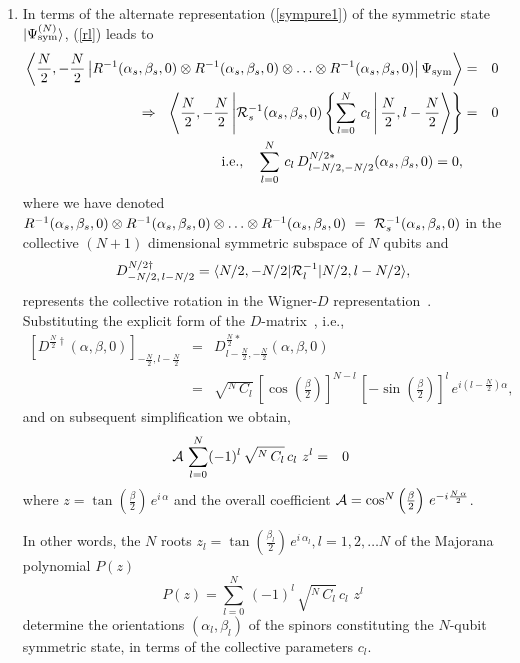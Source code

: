 \documentclass[pra,preprint,a4paper,superscriptaddress]{revtex4}
\begin{document}
{\begin{enumerate}
\item In terms of the alternate representation (\ref{sympure1}) of the symmetric state 
$\vert \Psi^{(N)}_{\rm sym}\rangle$, (\ref{rl}) leads to 
\begin{eqnarray}
\label{prelim}
\left\langle \frac{N}{2},-\frac{N}{2}\left\vert 
R^{-1}(\alpha_s,\beta_s,0)\otimes R^{-1}(\alpha_s,\beta_s,0)\otimes 
\ldots  \otimes R^{-1}(\alpha_s,\beta_s,0) \right \vert \Psi_{\rm sym}\right\rangle&=&0\nonumber \\ 
\Rightarrow\ \ \left\langle \frac{N}{2},-\frac{N}{2}\left \vert {\cal R}_s^{-1}(\alpha_s,\beta_s,0) \left\{\sum_{l=0}^N\, c_l\, \right \vert \frac{N}{2},l-\frac{N}{2}\right \rangle\right\}&=&0 \nonumber \\
{\rm i.e.,} \ \ \ \sum_{l=0}^N\, c_l\, D^{N/2*}_{l-N/2,-N/2}(\alpha_s,\beta_s,0)=0, &&
\end{eqnarray}
where we have denoted 
$R^{-1}(\alpha_s,\beta_s,0)\otimes R^{-1}(\alpha_s,\beta_s,0)\otimes 
\ldots  \otimes R^{-1}(\alpha_s,\beta_s,0)~=~{\cal R}^{-1}_s(\alpha_s,\beta_s,0)$ in the collective $(N+1)$ dimensional symmetric subspace of $N$ qubits and 
$$D^{N/2\dag}_{-N/2,\, l-N/2}=\langle N/2,-N/2\vert{\cal R}^{-1}_l 
 \vert N/2,l-N/2\rangle,$$
  represents the collective rotation   
 in the Wigner-$D$ representation~\cite{Rose}. 
Substituting the explicit form of the $D$-matrix~\cite{Rose}, i.e.,
\begin{eqnarray}
\label{dmatrix}
\left[D^{\frac{N}{2}\dag}(\alpha,\beta,0)\right]_{-\frac{N}{2},l-\frac{N}{2}}&=&D^{\frac{N}{2}*}_{l-\frac{N}{2},-\frac{N}{2}}(\alpha,\beta,0) \nonumber\\ 
&= & \sqrt{^N\,C_l}\, 
\left[\cos\left(\frac{\beta}{2}\right)\right]^{N-l}\, \left[-\sin\left(\frac{\beta}{2}\right)\right]^{l} \, e^{i(l-\frac{N}{2})\alpha},
\end{eqnarray}  
and on subsequent simplification we obtain,
\begin{eqnarray}
\label{cmj02}
{\cal A}\, \sum_{l=0}^N (-1)^l\,\sqrt{^N\, C_l}\,  c_l\,  \, z^{l}&=&0\,  
\end{eqnarray} 
where $z=\tan\left(\frac{\beta}{2}\right)\,e^{i\, \alpha}$ and 
the overall coefficient ${\cal A}=\cos^N\left(\frac{\beta}{2}\right)\,e^{-i\frac{N\,\alpha}{2}}$. 

In other words, 
the $N$ roots $z_l=\tan\left(\frac{\beta_l}{2}\right)\,e^{i\, \alpha_l}, l=1,2,\ldots N$ of the Majorana polynomial $P(z)$
\begin{equation} 
\label{Mp}
P(z)=\sum_{l=0}^N\, (-1)^l\, \sqrt{^N\, C_l}\,  c_l\,  \, z^{l}
\end{equation}
 determine the orientations $(\alpha_l,\beta_l)$ of the  spinors 
constituting the  $N$-qubit symmetric state, in terms of the collective parameters $c_l$.
\end{enumerate}

}
\end{document}
